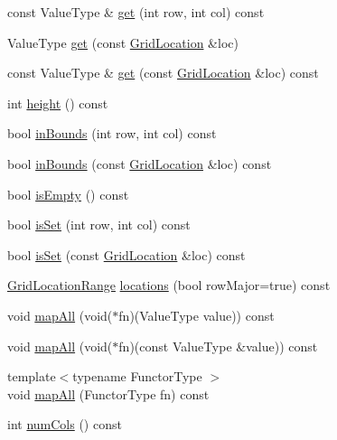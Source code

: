 \begin{DoxyCompactItemize}
\item 
const Value\+Type \& \mbox{\hyperlink{classSparseGrid_a2b88a9c3e739296050588ad389667146}{get}} (int row, int col) const
\item 
Value\+Type \mbox{\hyperlink{classSparseGrid_a9f9ad65f113e87072ae3b470ba803644}{get}} (const \mbox{\hyperlink{structGridLocation}{Grid\+Location}} \&loc)
\item 
const Value\+Type \& \mbox{\hyperlink{classSparseGrid_ad9a359dc416919242abe643f7677f491}{get}} (const \mbox{\hyperlink{structGridLocation}{Grid\+Location}} \&loc) const
\item 
int \mbox{\hyperlink{classSparseGrid_ad3774f6419003470f54fd495124ef51f}{height}} () const
\item 
bool \mbox{\hyperlink{classSparseGrid_aa0a86249b1e35e3b741f1e19283c298a}{in\+Bounds}} (int row, int col) const
\item 
bool \mbox{\hyperlink{classSparseGrid_a1b7d34c13c853a2ac9bdc084ec1535e9}{in\+Bounds}} (const \mbox{\hyperlink{structGridLocation}{Grid\+Location}} \&loc) const
\item 
bool \mbox{\hyperlink{classSparseGrid_acf82f9b2937375c7b1cf3dccb3df3312}{is\+Empty}} () const
\item 
bool \mbox{\hyperlink{classSparseGrid_ada2cb2e1981ec086e03f1c4133fb693e}{is\+Set}} (int row, int col) const
\item 
bool \mbox{\hyperlink{classSparseGrid_a6383fbed41061004e23dc30aded77575}{is\+Set}} (const \mbox{\hyperlink{structGridLocation}{Grid\+Location}} \&loc) const
\item 
\mbox{\hyperlink{classGridLocationRange}{Grid\+Location\+Range}} \mbox{\hyperlink{classSparseGrid_af170fd7f5c78f47c0a8c8c5ac937b39b}{locations}} (bool row\+Major=true) const
\item 
void \mbox{\hyperlink{classSparseGrid_a2c1f872cda6af6b5b52fda7107f0f296}{map\+All}} (void($\ast$fn)(Value\+Type value)) const
\item 
void \mbox{\hyperlink{classSparseGrid_a318509926b2642a5234b08ac2021cd0f}{map\+All}} (void($\ast$fn)(const Value\+Type \&value)) const
\item 
{\footnotesize template$<$typename Functor\+Type $>$ }\\void \mbox{\hyperlink{classSparseGrid_a8dc32c1e45704cfae41daf8adb4e66dc}{map\+All}} (Functor\+Type fn) const
\item 
int \mbox{\hyperlink{classSparseGrid_a5997e103e56aae1db12e1f7f02e136c5}{num\+Cols}} () const
\item 

\end{DoxyCompactItemize}

